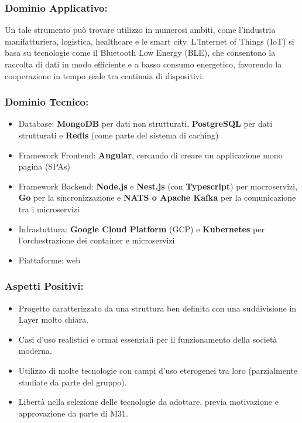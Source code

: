 \documentclass[a4paper,12pt]{article}
\begin{document}
\subsubsection*{Dominio Applicativo:} 
Un tale strumento può trovare utilizzo in numerosi ambiti, come l'industria manifatturiera, logistica, healthcare e le smart city. L’Internet of Things (IoT) si basa su tecnologie come il Bluetooth Low Energy (BLE), che consentono la raccolta di dati in modo efficiente e a basso consumo energetico, favorendo la cooperazione in tempo reale tra centinaia di dispositivi.
\subsubsection*{Dominio Tecnico:}
\begin{itemize}
    \item Database: \textbf{MongoDB} per dati non strutturati, \textbf{PostgreSQL} per dati strutturati e \textbf{Redis} (come parte del sistema di caching)
    \item Framework Frontend: \textbf{Angular}, cercando di creare un applicazione mono pagina (SPAs)
    \item Framework Backend: \textbf{Node.js} e \textbf{Nest.js} (con \textbf{Typescript}) per mocroservizi, \textbf{Go} per la sincronizzazione e \textbf{NATS o Apache Kafka} per la comunicazione tra i microservizi
    \item Infrastuttura: \textbf{Google Cloud Platform} (GCP) e \textbf{Kubernetes} per l'orchestrazione dei container e microservizi
    \item Piattaforme: web
\end{itemize}
\subsubsection*{Aspetti Positivi:}
\begin{itemize}
    \item Progetto caratterizzato da una struttura ben definita con una suddivisione in Layer molto chiara.
    \item Casi d’uso realistici e ormai essenziali per il funzionamento della società moderna.
    \item Utilizzo di molte tecnologie con campi d'uso eterogenei tra loro (parzialmente studiate da parte del gruppo).
    \item Libertà nella selezione delle tecnologie da adottare, previa motivazione e approvazione da parte di M31.
\end{itemize}
\end{document}
